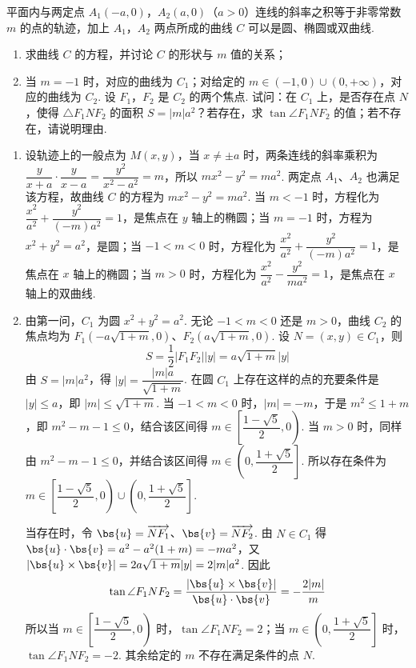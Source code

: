 \begin{problem}
平面内与两定点 \(A_{1}(-a,0)\)，\(A_{2}(a,0)\)（\(a>0\)）连线的斜率之积等于非零常数 \(m\) 的点的轨迹，加上 \(A_{1}\)，\(A_{2}\) 两点所成的曲线 \(C\) 可以是圆、椭圆或双曲线.
\begin{enumerate}
\item 求曲线 \(C\) 的方程，并讨论 \(C\) 的形状与 \(m\) 值的关系；
\item 当 \(m=-1\) 时，对应的曲线为 \(C_1\)；对给定的 \(m\in(-1,0)\cup(0,+\infty)\)，对应的曲线为 \(C_2\). 设 \(F_1\)，\(F_2\) 是 \(C_2\) 的两个焦点. 试问：在 \(C_1\) 上，是否存在点 \(N\)，使得 \(\triangle F_1NF_2\) 的面积 \(S=|m|a^2\)？若存在，求 \(\tan\angle F_1NF_2\) 的值；若不存在，请说明理由.
\end{enumerate}
\end{problem}

\begin{solution}
\begin{enumerate}
\item 设轨迹上的一般点为 \(M(x,y)\)，当 \(x\neq\pm a\) 时，两条连线的斜率乘积为 \(\dfrac{y}{x+a}\cdot\dfrac{y}{x-a}=\dfrac{y^2}{x^2-a^2}=m\)，所以 \(mx^2-y^2=ma^2\). 两定点 \(A_1\)、\(A_2\) 也满足该方程，故曲线 \(C\) 的方程为 \(mx^2-y^2=ma^2\). 当 \(m<-1\) 时，方程化为 \(\dfrac{x^2}{a^2}+\dfrac{y^2}{(-m)a^2}=1\)，是焦点在 \(y\) 轴上的椭圆；当 \(m=-1\) 时，方程为 \(x^2+y^2=a^2\)，是圆；当 \(-1<m<0\) 时，方程化为 \(\dfrac{x^2}{a^2}+\dfrac{y^2}{(-m)a^2}=1\)，是焦点在 \(x\) 轴上的椭圆；当 \(m>0\) 时，方程化为 \(\dfrac{x^2}{a^2}-\dfrac{y^2}{ma^2}=1\)，是焦点在 \(x\) 轴上的双曲线.
\item 由第一问，\(C_1\) 为圆 \(x^2+y^2=a^2\). 无论 \(-1<m<0\) 还是 \(m>0\)，曲线 \(C_2\) 的焦点均为 \(F_1\left(-a\sqrt{1+m},0\right)\)、\(F_2\left(a\sqrt{1+m},0\right)\). 设 \(N=(x,y)\in C_1\)，则
\[
S=\frac{1}{2}|F_1F_2||y|=a\sqrt{1+m}|y|
\]
由 \(S=|m|a^2\)，得 \(|y|=\dfrac{|m|a}{\sqrt{1+m}}\). 在圆 \(C_1\) 上存在这样的点的充要条件是 \(|y|\leqslant a\)，即 \(|m|\leqslant\sqrt{1+m}\). 当 \(-1<m<0\) 时，\(|m|=-m\)，于是 \(m^2\leqslant1+m\)，即 \(m^2-m-1\leqslant0\)，结合该区间得 \(m\in\left[\dfrac{1-\sqrt{5}}{2},0\right)\). 当 \(m>0\) 时，同样由 \(m^2-m-1\leqslant0\)，并结合该区间得 \(m\in\left(0,\dfrac{1+\sqrt{5}}{2}\right]\). 所以存在条件为 \(m\in\left[\dfrac{1-\sqrt{5}}{2},0\right)\cup\left(0,\dfrac{1+\sqrt{5}}{2}\right]\).

当存在时，令 \(\bs{u}=\overrightarrow{NF_1}\)、\(\bs{v}=\overrightarrow{NF_2}\). 由 \(N\in C_1\) 得 \(\bs{u}\cdot\bs{v}=a^2-a^2(1+m)=-ma^2\)，又 \(|\bs{u}\times\bs{v}|=2a\sqrt{1+m}|y|=2|m|a^2\). 因此
\[
\tan\angle F_1NF_2=\frac{|\bs{u}\times\bs{v}|}{\bs{u}\cdot\bs{v}}=-\frac{2|m|}{m}
\]
所以当 \(m\in\left[\dfrac{1-\sqrt{5}}{2},0\right)\) 时，\(\tan\angle F_1NF_2=2\)；当 \(m\in\left(0,\dfrac{1+\sqrt{5}}{2}\right]\) 时，\(\tan\angle F_1NF_2=-2\). 其余给定的 \(m\) 不存在满足条件的点 \(N\).
\end{enumerate}
\end{solution}

